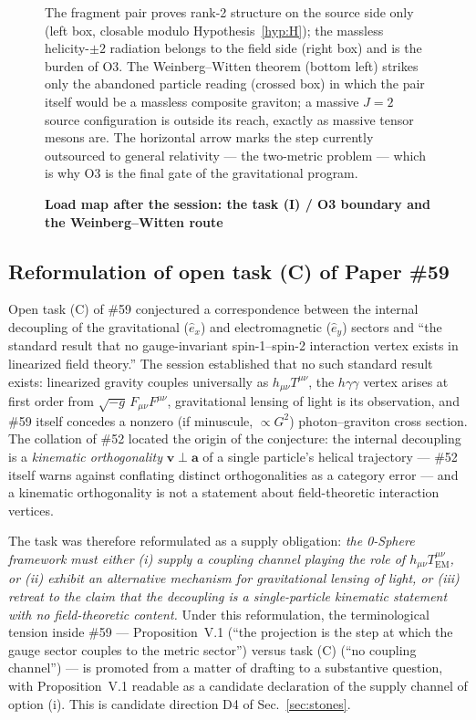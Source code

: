 \documentclass[%
 reprint, amsmath,amssymb, aps, prb, ]{revtex4-2}
\numberwithin{equation}{section}
\begin{document}
\begin{figure}[t!]
\caption{\textbf{Load map after the session: the task (I) / O3 boundary and the Weinberg--Witten route}}
\label{fig:loadmap}
\vspace{0.4em}
\begin{minipage}{0.95\textwidth}
\justifying\small
The fragment pair proves rank-2 structure on the source side only (left box, closable modulo Hypothesis~\ref{hyp:H}); the massless helicity-$\pm2$ radiation belongs to the field side (right box) and is the burden of O3. The Weinberg--Witten theorem (bottom left) strikes only the abandoned particle reading (crossed box) in which the pair itself would be a massless composite graviton; a massive $J=2$ source configuration is outside its reach, exactly as massive tensor mesons are. The horizontal arrow marks the step currently outsourced to general relativity --- the two-metric problem --- which is why O3 is the final gate of the gravitational program.
\end{minipage}
\end{figure}

\subsection{Reformulation of open task (C) of Paper \#59}
\label{sec:taskC}

Open task (C) of \#59 conjectured a correspondence between the internal decoupling of the gravitational ($\hat e_x$) and electromagnetic ($\hat e_y$) sectors and ``the standard result that no gauge-invariant spin-1--spin-2 interaction vertex exists in linearized field theory.'' The session established that no such standard result exists: linearized gravity couples universally as $h_{\mu\nu}T^{\mu\nu}$, the $h\gamma\gamma$ vertex arises at first order from $\sqrt{-g}\,F_{\mu\nu}F^{\mu\nu}$, gravitational lensing of light is its observation, and \#59 itself concedes a nonzero (if minuscule, $\propto G^2$) photon--graviton cross section. The collation of \#52 located the origin of the conjecture: the internal decoupling is a \emph{kinematic orthogonality} $\mathbf v\perp\mathbf a$ of a single particle's helical trajectory --- \#52 itself warns against conflating distinct orthogonalities as a category error --- and a kinematic orthogonality is not a statement about field-theoretic interaction vertices.

The task was therefore reformulated as a supply obligation: \emph{the 0-Sphere framework must either (i) supply a coupling channel playing the role of $h_{\mu\nu}T^{\mu\nu}_{\mathrm{EM}}$, or (ii) exhibit an alternative mechanism for gravitational lensing of light, or (iii) retreat to the claim that the decoupling is a single-particle kinematic statement with no field-theoretic content.} Under this reformulation, the terminological tension inside \#59 --- Proposition~V.1 (``the projection is the step at which the gauge sector couples to the metric sector'') versus task (C) (``no coupling channel'') --- is promoted from a matter of drafting to a substantive question, with Proposition~V.1 readable as a candidate declaration of the supply channel of option (i). This is candidate direction D4 of Sec.~\ref{sec:stones}.
\end{document}
